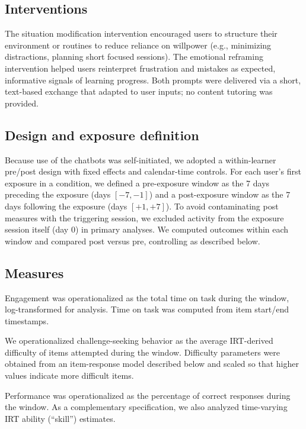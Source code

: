 \documentclass[11pt]{report}
\begin{document}
\begin{mainf}
\subsection*{Interventions}
The situation modification intervention encouraged users to structure their environment or routines to reduce reliance on willpower (e.g., minimizing distractions, planning short focused sessions).
The emotional reframing intervention helped users reinterpret frustration and mistakes as expected, informative signals of learning progress.
Both prompts were delivered via a short, text-based exchange that adapted to user inputs; no content tutoring was provided.

\subsection*{Design and exposure definition}
Because use of the chatbots was self-initiated, we adopted a within-learner pre/post design with fixed effects and calendar-time controls.
For each user’s first exposure in a condition, we defined a pre-exposure window as the 7 days preceding the exposure (days \([-7,-1]\)) and a post-exposure window as the 7 days following the exposure (days \([+1,+7]\)).
To avoid contaminating post measures with the triggering session, we excluded activity from the exposure session itself (day 0) in primary analyses.
We computed outcomes within each window and compared post versus pre, controlling as described below.

\subsection*{Measures}
Engagement was operationalized as the total time on task during the window, log-transformed for analysis. Time on task was computed from item start/end timestamps.

We operationalized challenge-seeking behavior as the average IRT-derived difficulty of items attempted during the window. Difficulty parameters were obtained from an item-response model described below and scaled so that higher values indicate more difficult items.

Performance was operationalized as the percentage of correct responses during the window. As a complementary specification, we also analyzed time-varying IRT ability (``skill'') estimates.


\end{mainf}
\end{document}

